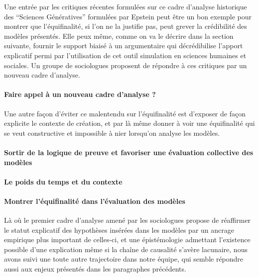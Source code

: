 Une entrée par les critiques récentes formulées sur ce cadre d'analyse historique des \enquote{Sciences Génératives} formulées par Epstein peut être un bon exemple pour montrer que l'équifinalité, si l'on ne la justifie pas, peut grever la crédibilité des modèles présentés. Elle peux même, comme on va le décrire dans la section suivante, fournir le support biaisé à un argumentaire qui décrédibilise l'apport explicatif permi par l'utilisation de cet outil simulation en sciences humaines et sociales. Un groupe de sociologues proposent de répondre à ces critiques par un nouveau cadre d'analyse.

\paragraph{Faire appel à un nouveau cadre d'analyse ?}
\label{p:cadre_analyse}


Une autre façon d'éviter ce malentendu sur l'équifinalité est d'exposer de façon explicite le contexte de création, et par là même donner à voir une équifinalité qui se veut constructive et impossible à nier lorsqu'on analyse les modèles.

\paragraph{Sortir de la logique de preuve et favoriser une évaluation collective des modèles}
\label{p:preuve}



\paragraph{Le poids du temps et du contexte }
\label{p:poids}



\paragraph{Montrer l'équifinalité dans l'évaluation des modèles}
\label{p:nvlle_equifinalite}

Là où le premier cadre d'analyse amené par les sociologues propose de réaffirmer le statut explicatif des hypothèses insérées dans les modèles par un ancrage empirique plus important de celles-ci, et une épistémologie admettant l'existence possible d'une explication même si la chaîne de causalité s'avère lacunaire, nous avons suivi une toute autre trajectoire dans notre équipe, qui semble répondre aussi aux enjeux présentés dans les paragraphes précédents.


